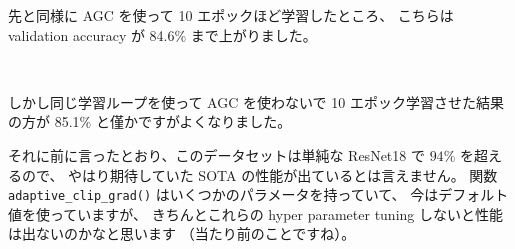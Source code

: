\documentclass[dvipdfmx,autodetect-engine,10pt,b5paper,papersize,openany,dvipsnames]{jsbook}
\begin{document}
\begin{multicols}{2}
\vspace{5.0cm}

先と同様に AGC を使って 10 エポックほど学習したところ、
こちらは validation accuracy が 84.6\% まで上がりました。


\vspace{2.8cm}


しかし同じ学習ループを使って AGC を使わないで 10 エポック学習させた結果の方が
 85.1\% と僅かですがよくなりました。


\vspace{4.5cm}

それに前に言ったとおり、このデータセットは単純な ResNet18 で $94\%$ を超えるので、
やはり期待していた SOTA の性能が出ているとは言えません。
関数 \texttt{adaptive\_clip\_grad()} はいくつかのパラメータを持っていて、
今はデフォルト値を使っていますが、
きちんとこれらの hyper parameter tuning しないと性能は出ないのかなと思います
（当たり前のことですね）。



\end{multicols}
\end{document}
